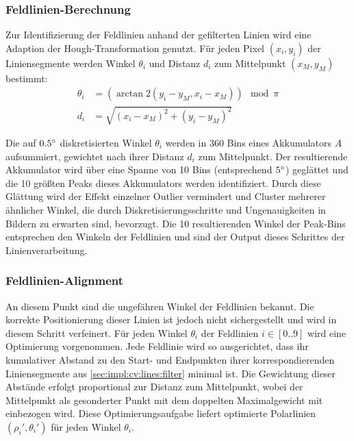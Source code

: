 \subsubsection{Feldlinien-Berechnung}
\label{sec:impl:cv:lines:fields}

Zur Identifizierung der Feldlinien anhand der gefilterten Linien wird eine Adaption der Hough-Transformation genutzt. Für jeden Pixel $(x_i, y_i)$ der Liniensegmente werden Winkel $\theta_i$ und Distanz $d_i$ zum Mittelpunkt $(x_M, y_M)$ bestimmt:
\begin{align*}
    \theta_i & =(\arctan2{(y_i - y_M, x_i - x_M)}) \mod \pi \\
    d_i      & =\sqrt{(x_i - x_M)^2+(y_i - y_M)^2}
\end{align*}

Die auf $0.5^{\circ}$ diskretisierten Winkel $\theta_i$ werden in 360 Bins eines Akkumulators $A$ aufsummiert, gewichtet nach ihrer Distanz $d_i$ zum Mittelpunkt. Der resultierende Akkumulator wird über eine Spanne von 10 Bins (entsprechend $5^{\circ}$) geglättet und die 10 größten Peaks dieses Akkumulators werden identifiziert. Durch diese Glättung wird der Effekt einzelner Outlier vermindert und Cluster mehrerer ähnlicher Winkel, die durch Diskretisierungsschritte und Ungenauigkeiten in Bildern zu erwarten sind, bevorzugt. Die 10 resultierenden Winkel der Peak-Bins entsprechen den Winkeln der Feldlinien und sind der Output dieses Schrittes der Linienverarbeitung.

\subsubsection{Feldlinien-Alignment}
\label{sec:impl:cv:lines:lines_align}

An diesem Punkt sind die ungefähren Winkel der Feldlinien bekannt. Die korrekte Positionierung dieser Linien ist jedoch nicht sichergestellt und wird in diesem Schritt verfeinert. Für jeden Winkel $\theta_i$ der Feldlinien $i \in [0..9]$ wird eine Optimierung vorgenommen. Jede Feldlinie wird so ausgerichtet, dass ihr kumulativer Abstand zu den Start- und Endpunkten ihrer korrespondierenden Liniensegmente aus \autoref{sec:impl:cv:lines:filter} minimal ist. Die Gewichtung dieser Abstände erfolgt proportional zur Distanz zum Mittelpunkt, wobei der Mittelpunkt als gesonderter Punkt mit dem doppelten Maximalgewicht mit einbezogen wird. Diese Optimierungsaufgabe liefert optimierte Polarlinien $(\rho_i', \theta_i')$ für jeden Winkel $\theta_i$.

